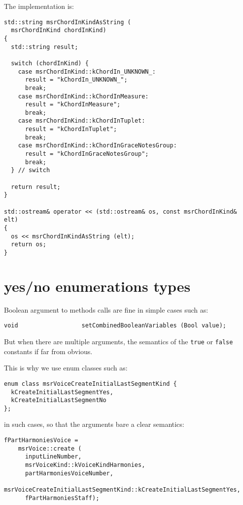The implementation is:
\begin{lstlisting}[language=CPlusPlus]
std::string msrChordInKindAsString (
  msrChordInKind chordInKind)
{
  std::string result;

  switch (chordInKind) {
    case msrChordInKind::kChordIn_UNKNOWN_:
      result = "kChordIn_UNKNOWN_";
      break;
    case msrChordInKind::kChordInMeasure:
      result = "kChordInMeasure";
      break;
    case msrChordInKind::kChordInTuplet:
      result = "kChordInTuplet";
      break;
    case msrChordInKind::kChordInGraceNotesGroup:
      result = "kChordInGraceNotesGroup";
      break;
  } // switch

  return result;
}

std::ostream& operator << (std::ostream& os, const msrChordInKind& elt)
{
  os << msrChordInKindAsString (elt);
  return os;
}
\end{lstlisting}


\section{yes/no enumerations types}

Boolean argument to methods calls are fine in simple cases such as:
\begin{lstlisting}[language=CPlusPlus]
    void                  setCombinedBooleanVariables (Bool value);
\end{lstlisting}

But when there are multiple arguments, the semantics of the {\tt true} or {\tt false} constants if far from obvious.

This is why we use enum classes such as:
\begin{lstlisting}[language=CPlusPlus]
enum class msrVoiceCreateInitialLastSegmentKind {
  kCreateInitialLastSegmentYes,
  kCreateInitialLastSegmentNo
};
\end{lstlisting}

in such cases, so that the arguments bare a clear semantics:
\begin{lstlisting}[language=CPlusPlus]
  fPartHarmoniesVoice =
    msrVoice::create (
      inputLineNumber,
      msrVoiceKind::kVoiceKindHarmonies,
      partHarmoniesVoiceNumber,
      msrVoiceCreateInitialLastSegmentKind::kCreateInitialLastSegmentYes,
      fPartHarmoniesStaff);
\end{lstlisting}


